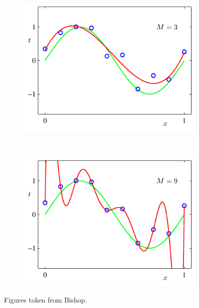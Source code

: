 \begin{figure}
    \begin{subfigure}[b]{0.45\textwidth}
                \centering
                \includegraphics[width=\textwidth]{./lecture1/Figure1_4c}
    \end{subfigure}%
	~
	\begin{subfigure}[b]{0.45\textwidth}
                \centering
                \includegraphics[width=\textwidth]{./lecture1/Figure1_4d}
    \end{subfigure}%
	\caption{Figures taken from Bishop.}
\end{figure}


